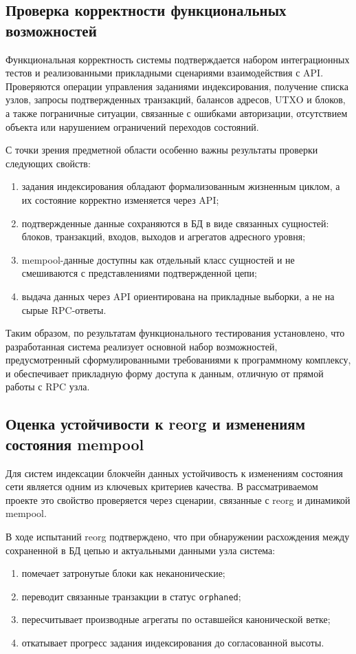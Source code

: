\subsection{Проверка корректности функциональных возможностей}

Функциональная корректность системы подтверждается набором интеграционных
тестов и реализованными прикладными сценариями взаимодействия с API.
Проверяются операции управления заданиями индексирования, получение списка узлов, запросы
подтвержденных транзакций, балансов адресов, UTXO и блоков, а также
пограничные ситуации, связанные с ошибками авторизации, отсутствием объекта
или нарушением ограничений переходов состояний.

С точки зрения предметной области особенно важны результаты проверки следующих
свойств:
\begin{enumerate}
    \item задания индексирования обладают формализованным жизненным циклом, а их
    состояние корректно изменяется через API;
    \item подтвержденные данные сохраняются в БД в виде связанных сущностей:
    блоков, транзакций, входов, выходов и агрегатов адресного уровня;
    \item mempool-данные доступны как отдельный класс сущностей и не смешиваются
    с представлениями подтвержденной цепи;
    \item выдача данных через API ориентирована на прикладные выборки, а не на
    сырые RPC-ответы.
\end{enumerate}

Таким образом, по результатам функционального тестирования установлено, что разработанная
система реализует основной набор возможностей, предусмотренный
сформулированными требованиями к программному комплексу, и обеспечивает
прикладную форму доступа к данным, отличную от прямой работы с RPC узла.

\subsection{Оценка устойчивости к reorg и изменениям состояния mempool}

Для систем индексации блокчейн данных устойчивость к изменениям состояния сети
является одним из ключевых критериев качества. В рассматриваемом проекте это
свойство проверяется через сценарии, связанные с reorg и динамикой mempool.

В ходе испытаний reorg подтверждено, что при обнаружении расхождения между
сохраненной в БД цепью и актуальными данными узла система:
\begin{enumerate}
    \item помечает затронутые блоки как неканонические;
    \item переводит связанные транзакции в статус \texttt{orphaned};
    \item пересчитывает производные агрегаты по оставшейся канонической ветке;
    \item откатывает прогресс задания индексирования до согласованной высоты.
\end{enumerate}

